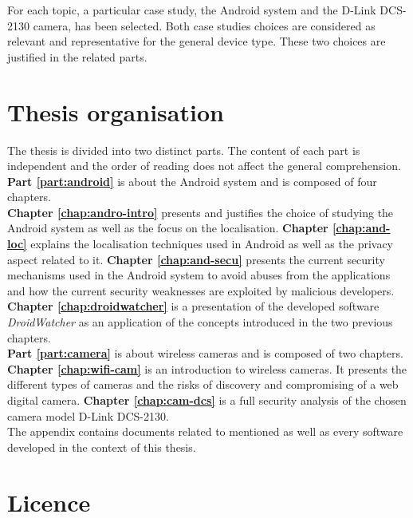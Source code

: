 For each topic, a particular case study, the Android system and the D-Link DCS-2130 camera, has been selected.
Both case studies choices are considered as relevant and representative for the general device type.
These two choices are justified in the related parts.


\section{Thesis organisation}

The thesis is divided into two distinct parts.
The content of each part is independent and the order of reading does not affect the general comprehension.\\

\textbf{Part \ref{part:android}} is about the Android system and is composed of four chapters.\\

\textbf{Chapter \ref{chap:andro-intro}} presents and justifies the choice of studying the Android system as well as the focus on the localisation.
\textbf{Chapter \ref{chap:and-loc}} explains the localisation techniques used in Android as well as the privacy aspect related to it.
\textbf{Chapter \ref{chap:and-secu}} presents the current security mechanisms used in the Android system to avoid abuses from the applications and how the current security weaknesses are exploited by malicious developers.
\textbf{Chapter \ref{chap:droidwatcher}} is a presentation of the developed software \emph{DroidWatcher} as an application of the concepts introduced in the two previous chapters.\\

\textbf{Part \ref{part:camera}} is about wireless cameras and is composed of two chapters.\\

\textbf{Chapter \ref{chap:wifi-cam}} is an introduction to wireless cameras.
It presents the different types of cameras and the risks of discovery and compromising of a web digital camera.
\textbf{Chapter \ref{chap:cam-dcs}} is a full security analysis of the chosen camera model D-Link DCS-2130.\\

The appendix contains documents related to mentioned as well as every software developed in the context of this thesis.

\section{Licence}

